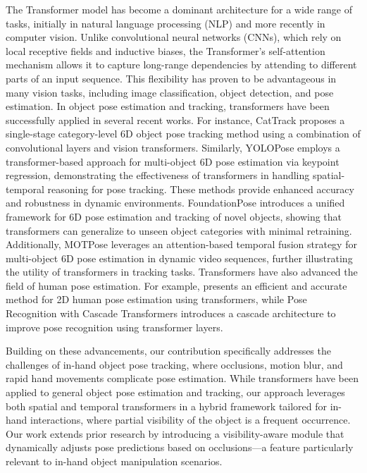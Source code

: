 The Transformer model \cite{vaswani2017attention} has become a dominant architecture for a wide range of tasks, initially in natural language processing (NLP) and more recently in computer vision. Unlike convolutional neural networks (CNNs), which rely on local receptive fields and inductive biases, the Transformer's self-attention mechanism allows it to capture long-range dependencies by attending to different parts of an input sequence. This flexibility has proven to be advantageous in many vision tasks, including image classification, object detection, and pose estimation. In object pose estimation and tracking, transformers have been successfully applied in several recent works. For instance, CatTrack \cite{yu2023cattrack} proposes a single-stage category-level 6D object pose tracking method using a combination of convolutional layers and vision transformers. Similarly, YOLOPose \cite{amini2022yolopose} employs a transformer-based approach for multi-object 6D pose estimation via keypoint regression, demonstrating the effectiveness of transformers in handling spatial-temporal reasoning for pose tracking. These methods provide enhanced accuracy and robustness in dynamic environments. FoundationPose \cite{wen2024foundationpose} introduces a unified framework for 6D pose estimation and tracking of novel objects, showing that transformers can generalize to unseen object categories with minimal retraining. Additionally, MOTPose \cite{periyasamy2024motpose} leverages an attention-based temporal fusion strategy for multi-object 6D pose estimation in dynamic video sequences, further illustrating the utility of transformers in tracking tasks. Transformers have also advanced the field of human pose estimation. For example, \cite{li2024efficient} presents an efficient and accurate method for 2D human pose estimation using transformers, while Pose Recognition with Cascade Transformers \cite{li2021pose} introduces a cascade architecture to improve pose recognition using transformer layers.

Building on these advancements, our contribution specifically addresses the challenges of in-hand object pose tracking, where occlusions, motion blur, and rapid hand movements complicate pose estimation. While transformers have been applied to general object pose estimation and tracking, our approach leverages both spatial and temporal transformers in a hybrid framework tailored for in-hand interactions, where partial visibility of the object is a frequent occurrence. Our work extends prior research by introducing a visibility-aware module that dynamically adjusts pose predictions based on occlusions—a feature particularly relevant to in-hand object manipulation scenarios.


